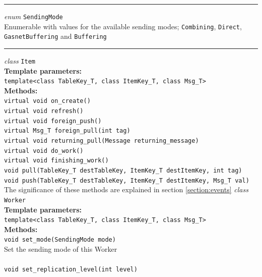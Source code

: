 \documentclass{uit-report}
\begin{document}
\begin{center}
	\noindent\rule{4cm}{1.2pt}
\end{center}

\textit{enum} \texttt{SendingMode}\\
\phantom{11111} Enumerable with values for the available sending modes;
\texttt{Combining},
\texttt{Direct},
\texttt{GasnetBuffering} and \texttt{Buffering}

\begin{center}
	\noindent\rule{4cm}{1.2pt}
\end{center}

\textit{class} \texttt{Item}\\
\textbf{Template parameters:}\\
\phantom{11111} \texttt{template<class TableKey\_T, class ItemKey\_T, class Msg\_T>}\\
\textbf{Methods:}\\
\phantom{11111} \texttt{virtual void on\_create()}\\
\phantom{11111} \texttt{virtual void refresh()}\\
\phantom{11111} \texttt{virtual void foreign\_push()}\\
\phantom{11111} \texttt{virtual Msg\_T foreign\_pull(int tag)}\\
\phantom{11111} \texttt{virtual void returning\_pull(Message returning\_message)}\\
\phantom{11111} \texttt{virtual void do\_work()}\\
\phantom{11111} \texttt{virtual void finishing\_work()}\\
\phantom{11111} \texttt{void pull(TableKey\_T destTableKey, ItemKey\_T destItemKey, int tag)}
\phantom{11111} \texttt{void push(TableKey\_T destTableKey, ItemKey\_T destItemKey, Msg\_T val)}
The significance of these methods are explained in section \ref{section:events}
\newpage
\textit{class} \texttt{Worker}\\
\textbf{Template parameters:}\\
\phantom{11111} \texttt{template<class TableKey\_T, class ItemKey\_T, class Msg\_T>}\\
\textbf{Methods:}\\
\phantom{11111} \texttt{void set\_mode(SendingMode mode)}\\
\phantom{11111}\phantom{11111} Set the sending mode of this Worker\\\\
\phantom{11111} \texttt{void set\_replication\_level(int level)}\\
\end{document}
